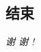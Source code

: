 \documentclass[hyperref={unicode},13pt,a4paper]{beamer}
\begin{document}
\begin{CJK*}{UTF8}{song}
\section{结束}
\begin{frame}
  \begin{center}
  \emph{\Huge{谢 谢 !}}
  \end{center}
\end{frame}

\end{CJK*}
\end{document}
